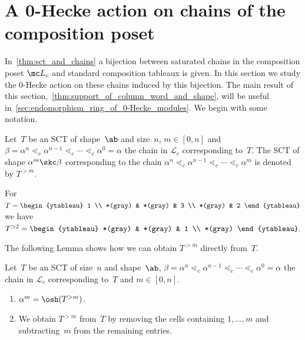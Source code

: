 \section{A 0-Hecke action on chains of the composition poset}

\label{sec:0-hecke_operation_and_chains}

In~\cref{thm:sct_and_chains} a bijection between saturated chains in the composition poset $\mc L_c$ and standard composition tableaux is given. 
In this section we study the 0-Hecke action on these chains induced by this bijection. The main result of this section,~\cref{thm:support_of_column_word_and_shape}, will be useful in~\cref{sec:endomorphism_ring_of_0-Hecke_modules}. We begin with some notation.

\begin{defi}
	\label{thm:parts_of_chains_in_L_c}
	Let~$T$ be an SCT of shape~$\ab$ and size~$n$, $m\in [0,n]$ and ${\beta = \alpha^n \lessdot_c \alpha^{n-1} \lessdot_c \cdots \lessdot_c \alpha^0 =\alpha}$ the chain in $\mathcal L_c$ corresponding to~$T$. 
	 The SCT of shape $\alpha^m \skc \beta$ corresponding to the chain $\alpha^n \lessdot_c \alpha^{n-1}\lessdot_c \cdots \lessdot_c \alpha^m$ is denoted by $T^{>m}$.
\end{defi}

\begin{exam}
	For 
	$T=\begin{ytableau}
	1 \\
	*(gray) & *(gray) & 3 \\
	*(gray) & 2
	\end{ytableau}$ 
	we have
	$ 
	T^{>2} = \begin{ytableau} 
	*(gray) & *(gray) & 1 \\
	*(gray) \end{ytableau}.
	$	
\end{exam}

The following Lemma shows how we can obtain $T^{>m}$ directly from~$T$.

\begin{lemma}
	\label{thm:cells_and_entries_of_restricted_tableaux}
	Let~$T$ be an SCT of size~$n$ and shape~$\ab$, $\beta = \alpha^n \lessdot_c \alpha^{n-1} \lessdot_c \cdots \lessdot_c \alpha^0 = \alpha$ the chain in $\mathcal{L}_c$ corresponding to~$T$ and $m\in [0,n]$.
	\begin{enumerate}
		\item\label{kemma3.3_1}	
		$\alpha^m = \osh(T^{>m})$.
		\item\label{kemma3.3_2} We obtain $T^{>m}$ from~$T$ by removing the cells containing $1,\dots, m$ and subtracting~$m$ from the remaining entries.
	\end{enumerate}
\end{lemma}

